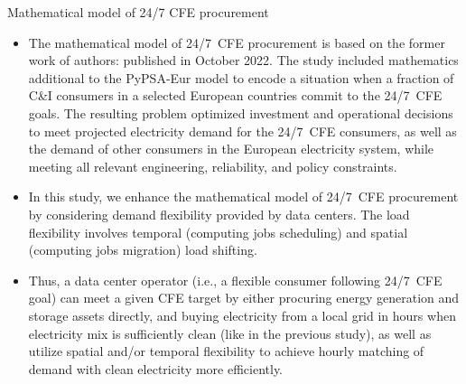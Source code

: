\begin{frame}{Mathematical model of 24/7 CFE procurement}
\label{CFEmodel}
  {\footnotesize
  \begin{itemize}
  \item The mathematical model of 24/7~CFE procurement is based on the former work of authors:  published in October 2022. The study included mathematics additional to the PyPSA-Eur model to encode a situation when a fraction of C\&I consumers in a selected European countries commit to the 24/7~CFE goals. The resulting problem optimized investment and operational decisions to meet projected electricity demand for the 24/7~CFE consumers, as well as the demand of other consumers in the European electricity system, while meeting all relevant engineering, reliability, and policy constraints.
  
  \item In this study, we enhance the mathematical model of 24/7~CFE procurement by considering demand flexibility provided by data centers. The load flexibility involves \alert{temporal} (computing jobs scheduling) and \alert{spatial} (computing jobs migration) load shifting. 

  \item Thus, a data center operator (i.e., a flexible consumer following 24/7~CFE goal) can meet a given CFE target by either procuring energy generation and storage assets directly, and buying electricity from a local grid in hours when electricity mix is sufficiently clean  (like in the previous study), as well as utilize spatial and/or temporal flexibility to achieve hourly matching of demand with clean electricity more efficiently.
  \end{itemize}
  }
\end{frame}



